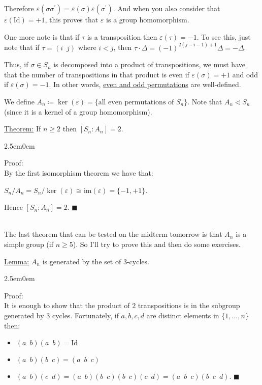 \documentclass{book}
\newcommand{\hTwo}{%
\color{Black}%
   \fontsize{13}{15}\selectfont%
}
\newcommand{\exTwo}{%
   \color{Purple}%
   \fontsize{13}{15}\selectfont%
}
\newcommand{\exThreeP}{%
   \color{RedViolet}%
   \fontsize{12}{14}\selectfont%
}
\newenvironment{myIndent}{%
   \begin{adjustwidth}{2.5em}{0em}%
}{%
   \end{adjustwidth}%
}
\newcommand{\udefine}[1]{{%
   \setulcolor{Red}%
   \setul{0.14em}{0.07em}%
   \ul{#1}%
}}
\newcommand{\gap}{\phantom{2}}
\newcommand{\myId}{\mathrm{Id}}
\newcommand{\myIm}{\mathrm{im}}
\newcommand{\mySepTwo}[1][.]{%
   {\noindent\color{#1}{\rule{6.5in}{0.5mm}}}\\%
}
\newcommand{\retTwo}{\hfill\bigbreak}
\begin{document}
Therefore $\varepsilon(\sigma \sigma^\prime) = \varepsilon(\sigma)\varepsilon(\sigma^\prime)$. And when you also consider that $\varepsilon(\myId) = +1$, this proves that $\varepsilon$ is a group homomorphism.\retTwo

One more note is that if $\tau$ is a transposition then $\varepsilon(\tau) = -1$. To see this, just note that if $\tau = (i\gap j)$ where $i < j$, then $\tau \cdot \Delta = (-1)^{2(j-i - 1) + 1}\Delta = -\Delta$.\newpage

Thus, if $\sigma \in S_n$ is decomposed into a product of transpositions, we must have that the number of transpositions in that product is even if $\varepsilon(\sigma) = +1$ and odd if $\varepsilon(\sigma) = -1$. In other words, \udefine{even and odd permutations} are well-defined.\retTwo

We define $A_n \coloneqq \ker(\varepsilon) = \{\text{all even permutations of } S_n\}$. Note that $A_n \lhd S_n$ (since it is a kernel of a group homomorphism).\retTwo

\exTwo\ul{Theorem:} If $n \geq 2$ then $[S_n : A_n] = 2$.
\begin{myIndent}\exThreeP
	Proof:\\
	By the first isomorphism theorem we have that:
	
	{\centering$S_n / A_n = S_n / \ker(\varepsilon) \cong \myIm(\varepsilon) = \{-1, +1\}$.\retTwo\par}
	
	Hence $[S_n : A_n] = 2$. $\blacksquare$
\end{myIndent}

\hTwo\mySepTwo

The last theorem that can be tested on the midterm tomorrow is that $A_n$ is a simple group (if $n \geq 5$). So I'll try to prove this and then do some exercises.\retTwo

\exTwo\ul{Lemma:} $A_n$ is generated by the set of $3$-cycles.
\begin{myIndent}\exThreeP
	Proof:\\
	It is enough to show that the product of $2$ transpositions is in the subgroup generated by $3$ cycles. Fortunately, if $a, b, c, d$ are distinct elements in $\{1, \ldots, n\}$ then:
	\begin{itemize}
	\item $(a\gap b)(a\gap b) = \myId$
	\item $(a \gap b)(b \gap c) = (a\gap b \gap c)$
	\item $(a \gap b)(c \gap d) = (a \gap b)(b \gap c)(b \gap c)(c \gap d) = (a\gap b \gap c)(b \gap c \gap d)$. $\blacksquare$\retTwo
	\end{itemize}
\end{myIndent}
\end{document}
